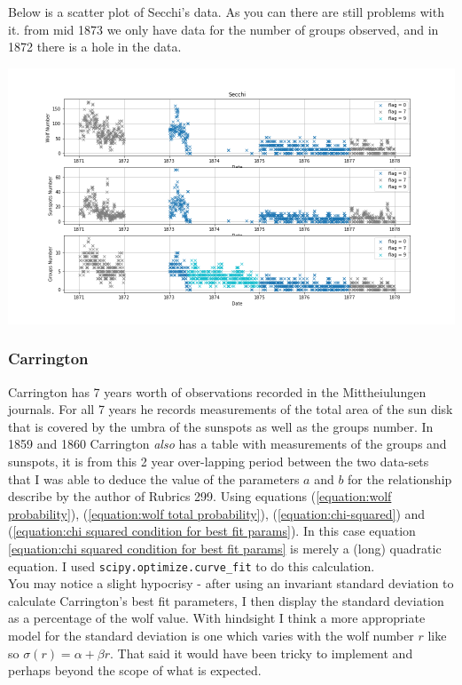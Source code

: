 \documentclass[12pt]{article}
\begin{document}
Below is a scatter plot of Secchi's data. As you can there are still problems with it. from mid 1873 we only have data for the number of groups observed, and in 1872 there is a hole in the data.\\

{\centering
    \includegraphics[width=\linewidth]{secchi_seperate_flags.png}
\par}

\subsubsection{Carrington}
Carrington has 7 years worth of observations recorded in the Mittheiulungen journals. For all 7 years he records measurements of the total area of the sun disk that is covered by the umbra of the sunspots as well as the groups number. In 1859 and 1860 Carrington \textit{also} has a table with measurements of the groups and sunspots, it is from this 2 year over-lapping period between the two data-sets that I was able to deduce the value of the parameters $a$ and $b$ for the relationship describe by the author of Rubrics 299. Using equations (\ref{equation:wolf probability}), (\ref{equation:wolf total probability}), (\ref{equation:chi-squared}) and (\ref{equation:chi squared condition for best fit params}). In this case equation \ref{equation:chi squared condition for best fit params} is merely a (long) quadratic equation. I used \texttt{scipy.optimize.curve\_fit} to do this calculation. \\

You may notice a slight hypocrisy - after using an invariant standard deviation to calculate Carrington's best fit parameters, I then display the standard deviation as a percentage of the wolf value. With hindsight I think a more appropriate model for the standard deviation is one which varies with the wolf number $r$ like so $\sigma(r) = \alpha + \beta r$. That said it would have been tricky to implement and perhaps beyond the scope of what is expected. \\
\end{document}
